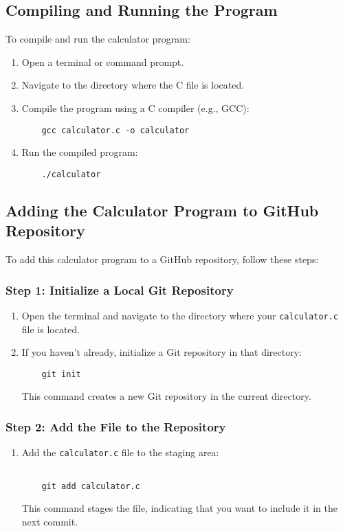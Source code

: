 \documentclass[a4paper,15pt]{article}
\begin{document}
\subsection{Compiling and Running the Program}
To compile and run the calculator program:
\begin{enumerate}
    \item Open a terminal or command prompt.
    \item Navigate to the directory where the C file is located.
    \item Compile the program using a C compiler (e.g., GCC):
    \begin{verbatim}
    gcc calculator.c -o calculator
    \end{verbatim}
    \item Run the compiled program:
    \begin{verbatim}
    ./calculator
    \end{verbatim}
\end{enumerate}

\subsection{Adding the Calculator Program to GitHub Repository}
To add this calculator program to a GitHub repository, follow these steps:

\subsubsection{Step 1: Initialize a Local Git Repository}
\begin{enumerate}
    \item Open the terminal and navigate to the directory where your \texttt{calculator.c} file is located.
    \item If you haven't already, initialize a Git repository in that directory:
    \begin{verbatim}
    git init
    \end{verbatim}
    This command creates a new Git repository in the current directory.
\end{enumerate}

\subsubsection{Step 2: Add the File to the Repository}
\begin{enumerate}
    \item Add the \texttt{calculator.c} file to the staging area:
    \begin{verbatim}

    git add calculator.c
    \end{verbatim}
    This command stages the file, indicating that you want to include it in the next commit.
\end{enumerate}
\end{document}
